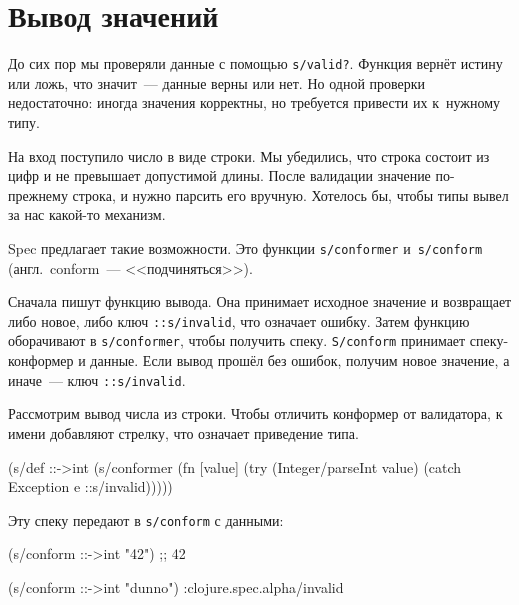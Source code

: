 \section{Вывод значений}

\label{spec-conform}


До сих пор мы проверяли данные с помощью \verb|s/valid?|. Функция вернёт
истину или ложь, что значит~--- данные верны или нет. Но одной проверки
недостаточно: иногда значения корректны, но требуется привести их к~нужному
типу.

На вход поступило число в виде строки. Мы убедились, что строка состоит из цифр
и не превышает допустимой длины. После валидации значение по-прежнему строка, и
нужно парсить его вручную. Хотелось бы, чтобы типы вывел за нас какой-то
механизм.


Spec предлагает такие возможности. Это функции \verb|s/conformer|
и~\verb|s/conform| (англ.~conform~--- <<подчиняться>>).

\label{spec-invalid}



Сначала пишут функцию вывода. Она принимает исходное значение и возвращает либо
новое, либо ключ \verb|::s/invalid|, что означает ошибку. Затем функцию
оборачивают в \verb|s/conformer|, чтобы получить спеку. \verb|S/conform|
принимает спеку-конформер и данные. Если вывод прошёл без ошибок, получим новое
значение, а иначе~--- ключ \verb|::s/invalid|.

Рассмотрим вывод числа из строки. Чтобы отличить конформер от валидатора, к
имени добавляют стрелку, что означает приведение типа.

\begin{english}
  \begin{clojure}
(s/def ::->int
  (s/conformer
   (fn [value]
     (try
       (Integer/parseInt value)
       (catch Exception e
         ::s/invalid)))))
  \end{clojure}
\end{english}

\noindent
Эту спеку передают в \verb|s/conform| с данными:

\begin{english}
  \begin{clojure}
(s/conform ::->int "42") ;; 42

(s/conform ::->int "dunno")
:clojure.spec.alpha/invalid
  \end{clojure}
\end{english}

